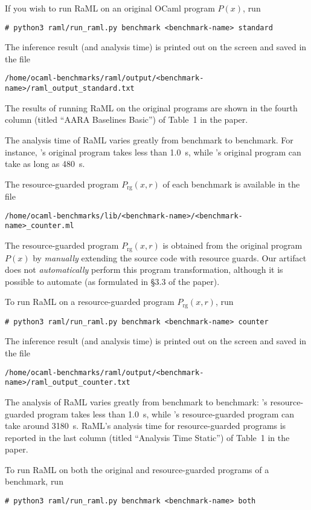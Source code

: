 If you wish to run RaML on an original OCaml program $P(x)$, run
\begin{verbatim}
# python3 raml/run_raml.py benchmark <benchmark-name> standard
\end{verbatim}
%
The inference result (and analysis time) is printed out on the screen and saved
in the file
\begin{verbatim}
/home/ocaml-benchmarks/raml/output/<benchmark-name>/raml_output_standard.txt
\end{verbatim}
%
The results of running RaML on the original programs are shown in the fourth
column (titled ``AARA Baselines Basic'') of Table~1 in the paper.

The analysis time of RaML varies greatly from benchmark to benchmark.
%
For instance, \mergesort{}'s original program takes less than
\qty{1.0}{\second}, while \redblacktree{}'s original program can take as long as
\qty{480}{\second}.

The resource-guarded program $P_{\mathrm{rg}}(x, r)$ of each benchmark is
available in the file
\begin{verbatim}
/home/ocaml-benchmarks/lib/<benchmark-name>/<benchmark-name>_counter.ml
\end{verbatim}
%
The resource-guarded program $P_{\mathrm{rg}}(x, r)$ is obtained from the
original program $P(x)$ by \emph{manually} extending the source code with
resource guards.
%
Our artifact does not \emph{automatically} perform this program transformation,
although it is possible to automate (as formulated in \S3.3 of the paper).

To run RaML on a resource-guarded program $P_{\mathrm{rg}}(x, r)$, run
\begin{verbatim}
# python3 raml/run_raml.py benchmark <benchmark-name> counter
\end{verbatim}
%
The inference result (and analysis time) is printed out on the screen and saved
in the file
\begin{verbatim}
/home/ocaml-benchmarks/raml/output/<benchmark-name>/raml_output_counter.txt
\end{verbatim}
%
The analysis of RaML varies greatly from benchmark to benchmark: \mergesort{}'s
resource-guarded program takes less than \qty{1.0}{\second}, while \dijkstra{}'s
resource-guarded program can take around \qty{3180}{\second}.
%
RaML's analysis time for resource-guarded programs is reported in the last
column (titled ``Analysis Time Static'') of Table~1 in the paper.

To run RaML on both the original and resource-guarded programs of a benchmark,
run
\begin{verbatim}
# python3 raml/run_raml.py benchmark <benchmark-name> both
\end{verbatim}

